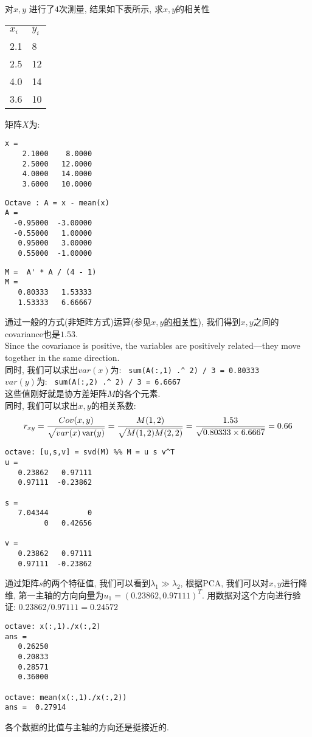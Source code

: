 \documentclass{article}
\begin{document}
\begin{example}
对$x,y$ 进行了$4$次测量, 结果如下表所示, 求$x,y$的相关性
\begin{table}[h]
\begin{tabular}{ll}
\hline
$x_i$ & $y_i$ \\
2.1   & 8     \\
2.5   & 12    \\ 
4.0   & 14    \\
3.6   & 10 \\
\end{tabular}
\end{table}

矩阵$X$为:
\begin{verbatim}
x =
    2.1000    8.0000
    2.5000   12.0000
    4.0000   14.0000
    3.6000   10.0000
\end{verbatim}
\begin{verbatim}
Octave : A = x - mean(x)
A =
  -0.95000  -3.00000
  -0.55000   1.00000
   0.95000   3.00000
   0.55000  -1.00000
\end{verbatim}
\begin{verbatim}
M =  A' * A / (4 - 1)
M =
   0.80333   1.53333
   1.53333   6.66667
\end{verbatim}
通过一般的方式(非矩阵方式)运算(参见\href{https://www0.gsb.columbia.edu/premba/analytical/s7/s7\_5.cfm}{$x,y$的相关性}), 我们得到$x,y$之间的covariance也是$1.53$.\\
Since the covariance is positive, the variables are positively related—they move together in the same direction.\\
同时, 我们可以求出$var(x)$为: \verb& sum(A(:,1) .^ 2) / 3 = 0.80333 & \\
$var(y)$为: \verb& sum(A(:,2) .^ 2) / 3 = 6.6667 & \\
这些值刚好就是协方差矩阵$M$的各个元素.\\
同时, 我们可以求出$x,y$的相关系数:
$$r_{xy} = \dfrac{Cov(x,y)}{\sqrt{var(x) \operatorname{var}(y)}} = \dfrac{M(1,2)}{\sqrt{M(1,2) M(2,2)}} = \dfrac{1.53}{\sqrt{0.80333 \times 6.6667}} = 0.66$$

\begin{verbatim}
octave: [u,s,v] = svd(M) %% M = u s v^T
u =
   0.23862   0.97111
   0.97111  -0.23862

s =
   7.04344         0
         0   0.42656

v =
   0.23862   0.97111
   0.97111  -0.23862
\end{verbatim}
通过矩阵$s$的两个特征值, 我们可以看到$\lambda_1 \gg \lambda_2$, 根据PCA, 我们可以对$x,y$进行降维, 第一主轴的方向向量为$u_1 = (0.23862, 0.97111)^T$. 用数据对这个方向进行验证:
$0.23862 / 0.97111 = 0.24572$

\begin{verbatim}
octave: x(:,1)./x(:,2)
ans =
   0.26250
   0.20833
   0.28571
   0.36000

octave: mean(x(:,1)./x(:,2))
ans =  0.27914
\end{verbatim}
各个数据的比值与主轴的方向还是挺接近的.
\end{example}
\end{document}

